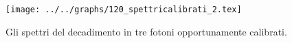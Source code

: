 \begin{figure}[h] \centering\texttt{[image: ../../graphs/120\_spettricalibrati\_2.tex]}\caption{Gli spettri del decadimento in tre fotoni opportunamente calibrati. }\label{gr:120_spettricalibrati_2} \end{figure}
